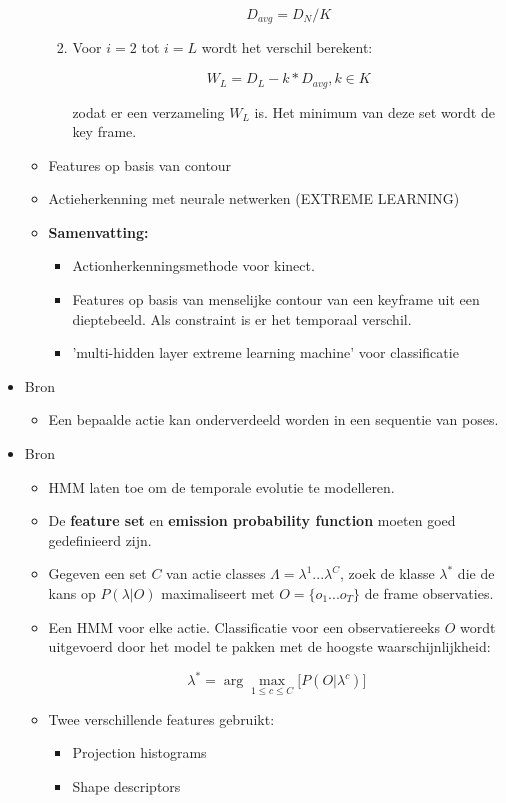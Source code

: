 \begin{itemize}
\begin{itemize}
\begin{enumerate}
			$$D_{avg} = D_N / K$$
			
			\item Voor $i = 2$ tot $i = L$ wordt het verschil berekent:
			
			$$W_L = D_L - k * D_{avg}, k \in K$$
			
			zodat er een verzameling ${W_L}$ is. Het minimum van deze set wordt de key frame.
		\end{enumerate}
		\item Features op basis van contour
		\item Actieherkenning met neurale netwerken (EXTREME LEARNING)
		\item \textbf{Samenvatting:}
		\begin{itemize}
			\item Actionherkenningsmethode voor kinect.
			\item Features op basis van menselijke contour van een keyframe uit een dieptebeeld. Als constraint is er het temporaal verschil.
			\item 'multi-hidden layer extreme learning machine' voor classificatie
		
		\end{itemize}
		
	\end{itemize}

	\item Bron \cite{Carlsson2001}
	\begin{itemize}
		\item Een bepaalde actie kan onderverdeeld worden in een sequentie van poses.
	\end{itemize}	

	\item Bron \cite{Vezzani2010}
	\begin{itemize}
		\item HMM laten toe om de temporale evolutie te modelleren.
		\item De \textbf{feature set} en \textbf{emission probability function} moeten goed gedefinieerd zijn. 
		\item Gegeven een set $C$ van actie classes $\Lambda = \lambda^1 ... \lambda^C$, zoek de klasse $\lambda^*$ die de kans op $P(\lambda|O)$ maximaliseert met $O = \{o_1 ... o_T\}$ de frame observaties.
		\item Een HMM voor elke actie. Classificatie voor een observatiereeks $O$ wordt uitgevoerd door het model te pakken met de hoogste waarschijnlijkheid:
		
				
		$$\lambda^* = \arg \max_{1\leq c\leq C} \big[P(O|\lambda^c)\big]$$
		\item Twee verschillende features gebruikt:
		\begin{itemize}
			\item Projection histograms
			\item Shape descriptors
		\end{itemize}
	\end{itemize}
\end{itemize}




